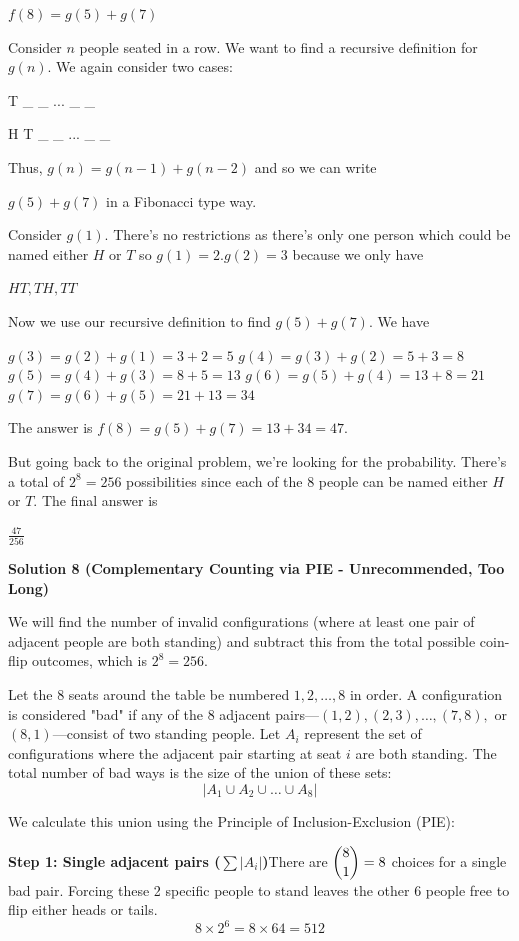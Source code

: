 \begin{enumerate}
 $f(8) = g(5) + g(7)$

 Consider $n$ people seated in a row. We want to find a recursive definition for $g(n)$. We again consider two cases:

 T \_ \_ ... \_ \_

 H T \_ \_ ... \_ \_

 Thus, $g(n) = g(n - 1) + g(n - 2)$ and so we can write

 $g(5) + g(7)$ in a Fibonacci type way.

 Consider $g(1)$. There's no restrictions as there's only one person which could be named either $H$ or $T$ so $g(1) = 2$.$g(2) = 3$ because we only have

 $HT, TH, TT$

 Now we use our recursive definition to find $g(5) + g(7)$. We have

 $g(3) = g(2) + g(1) = 3 + 2 = 5$
$g(4) = g(3) + g(2) = 5 + 3 = 8$
$g(5) = g(4) + g(3) = 8 + 5 = 13$
$g(6) = g(5) + g(4) = 13 + 8 = 21$
$g(7) = g(6) + g(5) = 21 + 13 = 34$

 The answer is $f(8) = g(5) + g(7) = 13 + 34 = 47$. 

 But going back to the original problem, we're looking for the probability. There's a total of $2^8 = 256$ possibilities since each of the $8$ people can be named either $H$ or $T$. The final answer is 

 $\frac{47}{256}$




\textbf{Solution 8 (Complementary Counting via PIE - Unrecommended, Too Long)}

We will find the number of invalid configurations (where at least one pair of adjacent people are both standing) and subtract this from the total possible coin-flip outcomes, which is $2^8 = 256$.

 Let the 8 seats around the table be numbered $1, 2, \dots, 8$ in order. A configuration is considered "bad" if any of the 8 adjacent pairs—$(1,2), (2,3), \dots, (7,8),$ or $(8,1)$—consist of two standing people. Let $A_i$ represent the set of configurations where the adjacent pair starting at seat $i$ are both standing. The total number of bad ways is the size of the union of these sets:
 \[|A_1 \cup A_2 \cup \dots \cup A_8|\]

 We calculate this union using the Principle of Inclusion-Exclusion (PIE):

 \textbf{Step 1: Single adjacent pairs ($\sum |A_i|$)}There are $\dbinom{8}{1} = 8$ choices for a single bad pair. Forcing these 2 specific people to stand leaves the other 6 people free to flip either heads or tails.
 \[8 \times 2^6 = 8 \times 64 = 512\]


\end{enumerate}
